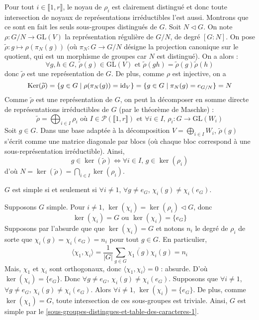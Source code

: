	\begin{demonstration}
		Pour tout $i \in \llbracket 1, r \rrbracket$, le noyau de $\rho_i$ est clairement distingué et donc toute intersection de noyaux de représentations irréductibles l'est aussi. Montrons que ce sont en fait les seuls sous-groupes distingués de $G$. Soit $N \lhd G$. On note $\rho : G/N \rightarrow \mathrm{GL}(V)$ la représentation régulière de $G/N$, de degré $[G : N]$. On pose $\widetilde{\rho} : g \mapsto \rho(\pi_N(g))$ (où $\pi_N : G \rightarrow G/N$ désigne la projection canonique sur le quotient, qui est un morphisme de groupes car $N$ est distingué). On a alors :
		\[ \forall g, h \in G, \, \widetilde{\rho}(g) \in \mathrm{GL}(V) \text{ et } \widetilde{\rho}(gh) = \widetilde{\rho}(g) \widetilde{\rho}(h) \]
		donc $\widetilde{\rho}$ est une représentation de $G$. De plus, comme $\rho$ est injective, on a
		\[ \mathrm{Ker}(\widetilde{\rho}) = \{ g \in G \mid \rho(\pi_N(g)) = \operatorname{id}_V \} = \{ g \in G \mid \pi_N(g) = e_{G/N} \} = N \]
		Comme $\widetilde{\rho}$ est une représentation de $G$, on peut la décomposer en somme directe de représentations irréductibles de $G$ (par le théorème de Maschke) :
		\[ \widetilde{\rho} = \bigoplus_{i \in I} \rho_i \text{ où } I \in \mathcal{P}(\llbracket 1, r \rrbracket) \text{ et } \forall i \in I, \, \rho_i : G \rightarrow \mathrm{GL}(W_i) \]
		Soit $g \in G$. Dans une base adaptée à la décomposition $V = \bigoplus_{i \in I} W_i$, $\widetilde{\rho}(g)$ s'écrit comme une matrice diagonale par blocs (où chaque bloc correspond à une sous-représentation irréductible). Ainsi,
		\[ g \in \ker(\widetilde{\rho}) \iff \forall i \in I, \, g \in \ker(\rho_i) \]
		d'où $N = \ker(\widetilde{\rho}) = \bigcap_{i \in I} \ker(\rho_i)$.
	\end{demonstration}

	\begin{corollary}
		$G$ est simple si et seulement si $\forall i \neq 1$, $\forall g \neq e_G$, $\chi_i(g) \neq \chi_i(e_G)$.
	\end{corollary}

	\begin{demonstration}
		 Supposons $G$ simple. Pour $i \neq 1$, $\ker(\chi_i) = \ker(\rho_i) \lhd G$, donc
		\[ \ker(\chi_i) = G \text{ ou } \ker(\chi_i) = \{ e_G \} \]
		Supposons par l'absurde que que $\ker(\chi_i) = G$ et notons $n_i$ le degré de $\rho_i$ de sorte que $\chi_i(g) = \chi_i(e_G) = n_i$ pour tout $g \in G$. En particulier,
		\[ \langle \chi_1, \chi_i \rangle = \frac{1}{|G|} \sum_{g \in G} \overline{\chi_1(g)} \chi_i(g) = n_i \]
		Mais, $\chi_1$ et $\chi_i$ sont orthogonaux, donc $\langle \chi_1, \chi_i \rangle = 0$ : absurde. D'où $\ker(\chi_i) = \{ e_G \}$. Donc $\forall g \neq e_G$, $\chi_i(g) \neq \chi_i(e_G)$.
		\newpar
		 Supposons que $\forall i \neq 1$, $\forall g \neq e_G$, $\chi_i(g) \neq \chi_i(e_G)$. Alors $\forall i \neq 1$, $\ker(\chi_i) = \{ e_G \}$. De plus, comme $\ker(\chi_1) = G$, toute intersection de ces sous-groupes est triviale. Ainsi, $G$ est simple par le \cref{sous-groupes-distingues-et-table-des-caracteres-1}.
	\end{demonstration}

